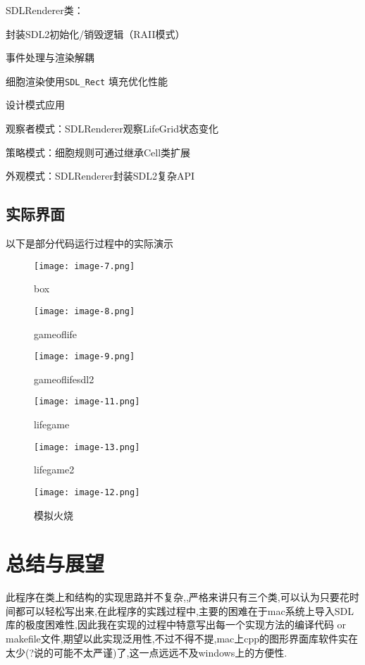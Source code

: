 \documentclass[forprint]{WHUBachelor}
\begin{document}
SDLRenderer类：

封装SDL2初始化/销毁逻辑（RAII模式）

事件处理与渲染解耦

细胞渲染使用\texttt{SDL\_Rect} 填充优化性能


设计模式应用

观察者模式：SDLRenderer观察LifeGrid状态变化

策略模式：细胞规则可通过继承Cell类扩展

外观模式：SDLRenderer封装SDL2复杂API



\section{实际界面}
以下是部分代码运行过程中的实际演示
\begin{figure}[h]
    \centering
    \texttt{[image: image-7.png]}
    \caption{box}
    \label{fig:gui}
\end{figure}
\begin{figure}[h]
    \centering
    \texttt{[image: image-8.png]}
    \caption{gameoflife}
    \label{fig:gui}
\end{figure}
\begin{figure}[h]
    \centering
    \texttt{[image: image-9.png]}
    \caption{gameoflifesdl2}
    \label{fig:gui}
\end{figure}
\begin{figure}[h]
    \centering
    \texttt{[image: image-11.png]}
    \caption{lifegame}
    \label{fig:gui}
\end{figure}
\begin{figure}[h]
    \centering
    \texttt{[image: image-13.png]}
    \caption{lifegame2}
    \label{fig:gui}
\end{figure}
\begin{figure}[h]
    \centering
    \texttt{[image: image-12.png]}
    \caption{模拟火烧}
    \label{fig:gui}
\end{figure}
\chapter{总结与展望}
此程序在类上和结构的实现思路并不复杂,,严格来讲只有三个类,可以认为只要花时间都可以轻松写出来,在此程序的实践过程中,主要的困难在于mac系统上导入SDL库的极度困难性,因此我在实现的过程中特意写出每一个实现方法的编译代码 or makefile文件,期望以此实现泛用性,不过不得不提,mac上cpp的图形界面库软件实在太少(?说的可能不太严谨)了,这一点远远不及windows上的方便性.
\end{document}
